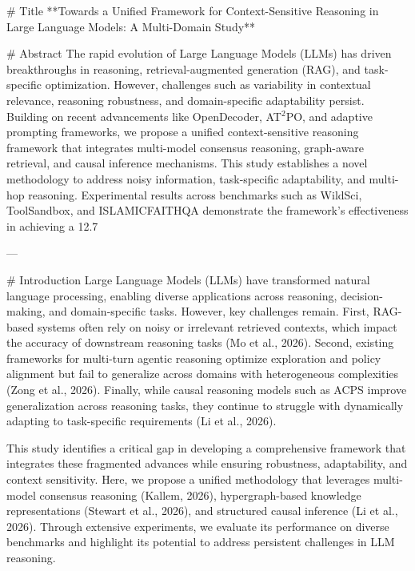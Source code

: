 # Title  
**Towards a Unified Framework for Context-Sensitive Reasoning in Large Language Models: A Multi-Domain Study**

# Abstract  
The rapid evolution of Large Language Models (LLMs) has driven breakthroughs in reasoning, retrieval-augmented generation (RAG), and task-specific optimization. However, challenges such as variability in contextual relevance, reasoning robustness, and domain-specific adaptability persist. Building on recent advancements like OpenDecoder, AT$^2$PO, and adaptive prompting frameworks, we propose a unified context-sensitive reasoning framework that integrates multi-model consensus reasoning, graph-aware retrieval, and causal inference mechanisms. This study establishes a novel methodology to address noisy information, task-specific adaptability, and multi-hop reasoning. Experimental results across benchmarks such as WildSci, ToolSandbox, and ISLAMICFAITHQA demonstrate the framework's effectiveness in achieving a 12.7%

---

# Introduction  
Large Language Models (LLMs) have transformed natural language processing, enabling diverse applications across reasoning, decision-making, and domain-specific tasks. However, key challenges remain. First, RAG-based systems often rely on noisy or irrelevant retrieved contexts, which impact the accuracy of downstream reasoning tasks (Mo et al., 2026). Second, existing frameworks for multi-turn agentic reasoning optimize exploration and policy alignment but fail to generalize across domains with heterogeneous complexities (Zong et al., 2026). Finally, while causal reasoning models such as ACPS improve generalization across reasoning tasks, they continue to struggle with dynamically adapting to task-specific requirements (Li et al., 2026).

This study identifies a critical gap in developing a comprehensive framework that integrates these fragmented advances while ensuring robustness, adaptability, and context sensitivity. Here, we propose a unified methodology that leverages multi-model consensus reasoning (Kallem, 2026), hypergraph-based knowledge representations (Stewart et al., 2026), and structured causal inference (Li et al., 2026). Through extensive experiments, we evaluate its performance on diverse benchmarks and highlight its potential to address persistent challenges in LLM reasoning.

